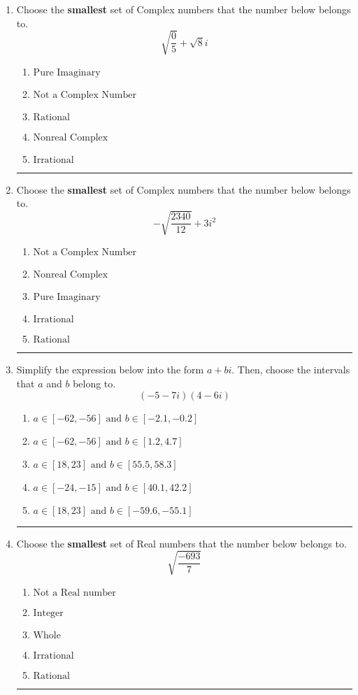 \documentclass[14pt]{extbook}
\newcommand{\litem}[1]{\item#1\hspace*{-1cm}\rule{\textwidth}{0.4pt}}
\begin{document}
\begin{enumerate}
{\begin{enumerate}[label=\Alph*.]
\end{enumerate} }
\litem{
Choose the \textbf{smallest} set of Complex numbers that the number below belongs to.\[ \sqrt{\frac{0}{5}}+\sqrt{8}i \]\begin{enumerate}[label=\Alph*.]
\item \( \text{Pure Imaginary} \)
\item \( \text{Not a Complex Number} \)
\item \( \text{Rational} \)
\item \( \text{Nonreal Complex} \)
\item \( \text{Irrational} \)

\end{enumerate} }
\litem{
Choose the \textbf{smallest} set of Complex numbers that the number below belongs to.\[ -\sqrt{\frac{2340}{12}}+3i^2 \]\begin{enumerate}[label=\Alph*.]
\item \( \text{Not a Complex Number} \)
\item \( \text{Nonreal Complex} \)
\item \( \text{Pure Imaginary} \)
\item \( \text{Irrational} \)
\item \( \text{Rational} \)

\end{enumerate} }
\litem{
Simplify the expression below into the form $a+bi$. Then, choose the intervals that $a$ and $b$ belong to.\[ (-5 - 7 i)(4 - 6 i) \]\begin{enumerate}[label=\Alph*.]
\item \( a \in [-62, -56] \text{ and } b \in [-2.1, -0.2] \)
\item \( a \in [-62, -56] \text{ and } b \in [1.2, 4.7] \)
\item \( a \in [18, 23] \text{ and } b \in [55.5, 58.3] \)
\item \( a \in [-24, -15] \text{ and } b \in [40.1, 42.2] \)
\item \( a \in [18, 23] \text{ and } b \in [-59.6, -55.1] \)

\end{enumerate} }
\litem{
Choose the \textbf{smallest} set of Real numbers that the number below belongs to.\[ \sqrt{\frac{-693}{7}} \]\begin{enumerate}[label=\Alph*.]
\item \( \text{Not a Real number} \)
\item \( \text{Integer} \)
\item \( \text{Whole} \)
\item \( \text{Irrational} \)
\item \( \text{Rational} \)


\end{enumerate}}
\end{enumerate}
\end{document}

